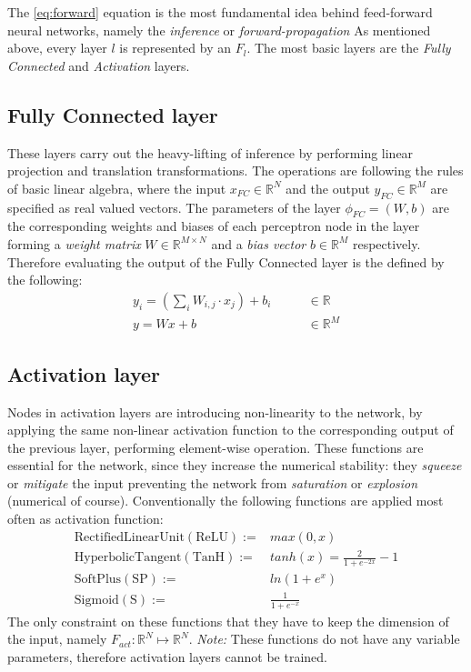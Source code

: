 The \ref{eq:forward} equation is the most fundamental idea behind feed-forward neural networks, namely the \emph{inference} or \emph{forward-propagation}
As mentioned above, every layer $l$ is represented by an $F_l$. 
The most basic layers are the \emph{Fully Connected} and \emph{Activation} layers.

\subsection{Fully Connected layer} 
These layers carry out the heavy-lifting of inference by performing linear projection and translation transformations. 
The operations are following the rules of basic linear algebra, where the input $x_{FC} \in \mathbb{R}^N$ and the output $y_{FC} \in \mathbb{R}^M$ are specified as real valued vectors.
The parameters of the layer $\phi_{FC}=(W, b)$ are the corresponding weights and biases of each perceptron node in the layer forming a \emph{weight matrix} $W \in \mathbb{R}^{M \times N}$ and a \emph{bias vector} $b \in \mathbb{R}^M$ respectively.
Therefore evaluating the output of the Fully Connected layer is the defined by the following:
\begin{equation}\label{eq:FC}
\begin{split}
    y_i = \left(\sum_i W_{i,j} \cdot x_j \right) + b_i \qquad &\in \mathbb{R}\\
    y = Wx + b \qquad &\in \mathbb{R}^M
\end{split}
\end{equation}
\subsection{Activation layer} 
Nodes in activation layers are introducing non-linearity to the network, by applying the same non-linear activation function to the corresponding output of the previous layer, performing element-wise operation.
These functions are essential for the network, since they increase the numerical stability: they \emph{squeeze} or \emph{mitigate} the input preventing the network from \emph{saturation} or \emph{explosion} (numerical of course). Conventionally the following functions are applied most often as activation function:
\begin{align*}
    \mathrm{Rectified Linear Unit (ReLU) := } &max(0, x) \\
    \mathrm{Hyperbolic Tangent (TanH) := }   &tanh(x) = \frac{2}{1+e^{-2x}}-1 \\
    \mathrm{SoftPlus (SP) := }   &ln(1+e^x) \\
    \mathrm{Sigmoid (S) := }  &\frac{1}{1+e^{-x}}
\end{align*}
The only constraint on these functions that they have to keep the dimension of the input, namely $F_{act}:\mathbb{R}^N \mapsto \mathbb{R}^N$.
\emph{Note:} These functions do not have any variable parameters, therefore activation layers cannot be trained.

